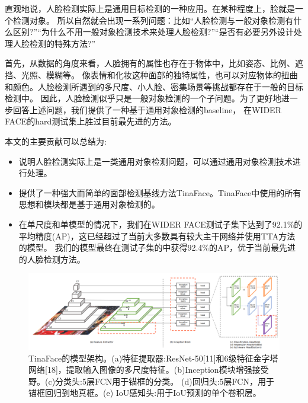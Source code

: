 \documentclass[twocolumn,10pt,a4paper]{article}%
\begin{document}
	直观地说，人脸检测实际上是通用目标检测的一种应用。在某种程度上，脸就是一个检测对象。
	所以自然就会出现一系列问题：比如“人脸检测与一般对象检测有什么区别?”“为什么不用一般对象检测技术来处理人脸检测?”“是否有必要另外设计处理人脸检测的特殊方法?”
	
	首先，从数据的角度来看，人脸拥有的属性也存在于物体中，比如姿态、比例、遮挡、光照、模糊等。
	像表情和化妆这种面部的独特属性，也可以对应物体的扭曲和颜色。人脸检测所遇到的多尺度、小人脸、密集场景等挑战都存在于一般的目标检测中。
	因此，人脸检测似乎只是一般对象检测的一个子问题。为了更好地进一步回答上述问题，我们提供了一种基于通用对象检测的baseline，
	在WIDER FACE的hard测试集上胜过目前最先进的方法。

	本文的主要贡献可以总结为:
	\begin{itemize}
		\item 说明人脸检测实际上是一类通用对象检测问题，可以通过通用对象检测技术进行处理。
		\item 提供了一种强大而简单的面部检测基线方法TinaFace。TinaFace中使用的所有思想和模块都是基于通用对象检测的。
		\item 在单尺度和单模型的情况下，我们在WIDER FACE测试子集下达到了92.1\%的平均精度(AP)，这已经超过了当前大多数具有较大主干网络并使用TTA方法的模型。
		我们的模型最终在测试子集的中获得92.4\%的AP，优于当前最先进的人脸检测方法。
	\end{itemize}
	\begin{figure}[ht]%
		\centering
		\begin{minipage}{1\textwidth}%
			\centering
			\includegraphics[width=1.0\textwidth]{architecture.png}%
			\caption{\fontsize{10pt}{15pt}\selectfont 
			TinaFace的模型架构。(a)特征提取器:ResNet-50[11]和6级特征金字塔网络[18]，提取输入图像的多尺度特征。(b)Inception模块增强接受野。(c)分类头:5层FCN用于锚框的分类。
			(d)回归头:5层FCN，用于锚框回归到地真框。(e) IoU感知头:用于IoU预测的单个卷积层。
		}%
		\end{minipage}
	\end{figure}	
\end{document}

